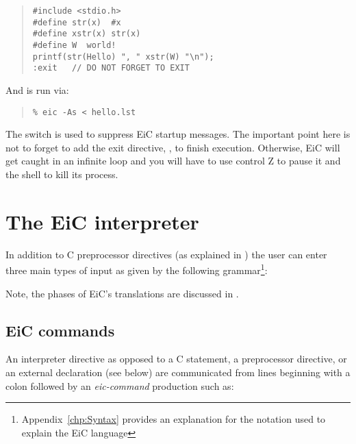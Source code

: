 \begin{quote}
\begin{verbatim}
#include <stdio.h>
#define str(x)  #x
#define xstr(x) str(x)
#define W  world!
printf(str(Hello) ", " xstr(W) "\n");
:exit   // DO NOT FORGET TO EXIT
\end{verbatim}
\end{quote}

And is run via:
\begin{quote}
\begin{verbatim}
% eic -As < hello.lst
\end{verbatim}
\end{quote}

The  switch is used to suppress
EiC startup messages. The important point here is not to forget to
add the exit directive,
, to finish execution. Otherwise, EiC will get caught in an
infinite loop and you will have to use control Z to pause it and
the shell to kill its process.

\section{The EiC interpreter}
\label{sec:EiCInterpreter}

In addition to C preprocessor directives (as explained in
) the user can enter three main types
of input as given by the following
grammar\footnote{Appendix~\ref{chp:Syntax} provides an explanation for
the notation used to explain the EiC language}:

\small
\begin{quote}
\end{quote}
\normalsize

Note, the phases of EiC's translations are discussed in
.



\subsection{EiC commands}
\label{sec:EiCcommands}
An interpreter directive as opposed to a C statement, a preprocessor
directive, or an external declaration (see below) are communicated from 
lines beginning with a colon \T{:} followed by an {\it
eic-command} production such as:

